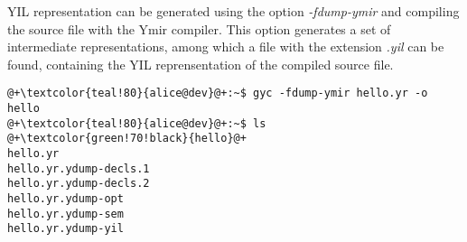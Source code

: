 YIL representation can be generated using the option \textit{-fdump-ymir} and
compiling the source file with the Ymir compiler. This option generates a set of
intermediate representations, among which a file with the extension
\textit{.yil} can be found, containing the YIL reprensentation of the compiled
source file.

\begin{lstlisting}[style=bashVerb, escapechar=@+]
@+\textcolor{teal!80}{alice@dev}@+:~$ gyc -fdump-ymir hello.yr -o hello
@+\textcolor{teal!80}{alice@dev}@+:~$ ls
@+\textcolor{green!70!black}{hello}@+
hello.yr
hello.yr.ydump-decls.1
hello.yr.ydump-decls.2
hello.yr.ydump-opt
hello.yr.ydump-sem
hello.yr.ydump-yil
\end{lstlisting}
